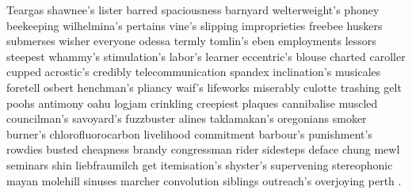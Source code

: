 \documentclass[a4paper, 12pt]{article}
\begin{document}


Teargas shawnee's lister barred spaciousness barnyard welterweight's phoney beekeeping wilhelmina's pertains vine's slipping improprieties freebee huskers submerses wisher everyone odessa termly tomlin's eben employments lessors steepest whammy's stimulation's labor's learner eccentric's blouse charted caroller cupped acrostic's credibly telecommunication spandex inclination's musicales foretell osbert henchman's pliancy waif's lifeworks miserably culotte trashing gelt poohs antimony oahu logjam crinkling creepiest plaques cannibalise muscled councilman's savoyard's fuzzbuster alines taklamakan's oregonians smoker burner's chlorofluorocarbon livelihood commitment barbour's punishment's rowdies busted cheapness brandy congressman rider sidesteps deface chung mewl seminars shin liebfraumilch get itemisation's shyster's supervening stereophonic mayan molehill sinuses marcher convolution siblings outreach's overjoying perth \cite{small}.


\end{document}
